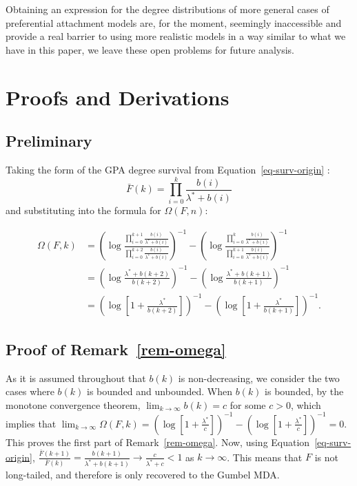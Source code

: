 \documentclass[
  sn-basic,
  10pt,
]{sn-jnl}
\theoremstyle{thmstyleone}
\theoremstyle{thmstyleone}
\theoremstyle{remark}
\theoremstyle{plain}
\theoremstyle{plain}
\theoremstyle{remark}
\begin{document}
Obtaining an expression for the degree distributions of more general
cases of preferential attachment models are, for the moment, seemingly
inaccessible and provide a real barrier to using more realistic models
in a way similar to what we have in this paper, we leave these open
problems for future analysis.

\setcounter{section}{0}
\renewcommand{\thesection}{\Alph{section}}
\setcounter{table}{0}
\renewcommand{\thetable}{A\arabic{table}}
\setcounter{figure}{0}
\renewcommand{\thefigure}{A\arabic{figure}}

\newpage

\section{Proofs and Derivations}\label{sec-proofs}

\subsection{Preliminary}\label{preliminary}

Taking the form of the GPA degree survival from
Equation~\ref{eq-surv-origin} : \[
\bar F(k) = \prod_{i=0}^k\frac{b(i)}{\lambda^*+b(i)}
\] and substituting into the formula for \(\Omega(F,n)\):

\begin{align*}
\Omega(F,k)&=\left(\log\frac{\prod_{i=0}^{k+1}\frac{b(i)}{\lambda^{*}+b(i)}}{\prod_{i=0}^{k+2}\frac{b(i)}{\lambda^{*}+b(i)}}\right)^{-1}-\left(\log\frac{\prod_{i=0}^{k}\frac{b(i)}{\lambda^{*}+b(i)}}{\prod_{i=0}^{k+1}\frac{b(i)}{\lambda^{*}+b(i)}}\right)^{-1}\\
&=\left(\log\frac{\lambda^{*}+b(k+2)}{b(k+2)}\right)^{-1}-\left(\log\frac{\lambda^{*}+b(k+1)}{b(k+1)}\right)^{-1}\\
&=\left(\log\left[1+\frac{\lambda^{*}}{b(k+2)}\right]\right)^{-1}-\left(\log\left[1+\frac{\lambda^{*}}{b(k+1)}\right]\right)^{-1}.
\end{align*}

\subsection{\texorpdfstring{Proof of
Remark~\ref{rem-omega}}{Proof of Remark~}}\label{sec-remproof}

As it is assumed throughout that \(b(k)\) is non-decreasing, we consider
the two cases where \(b(k)\) is bounded and unbounded. When \(b(k)\) is
bounded, by the monotone convergence theorem,
\(\lim_{k\rightarrow\infty}b(k) = c\) for some \(c>0\), which implies
that
\(\lim_{k\rightarrow\infty}\Omega(F,k)=\left(\log\left[1+\frac{\lambda^{*}}{c}\right]\right)^{-1}-\left(\log\left[1+\frac{\lambda^{*}}{c}\right]\right)^{-1}= 0\).
This proves the first part of Remark~\ref{rem-omega}. Now, using
Equation~\ref{eq-surv-origin},
\(\frac{\bar{F}(k+1)}{\bar{F}(k)}=\frac{b(k+1)}{\lambda^{*}+b(k+1)}\rightarrow\frac{c}{\lambda^{*}+c}<1\)
as \(k\rightarrow\infty\). This means that \(F\) is not long-tailed, and
therefore is only recovered to the Gumbel MDA.
\end{document}
